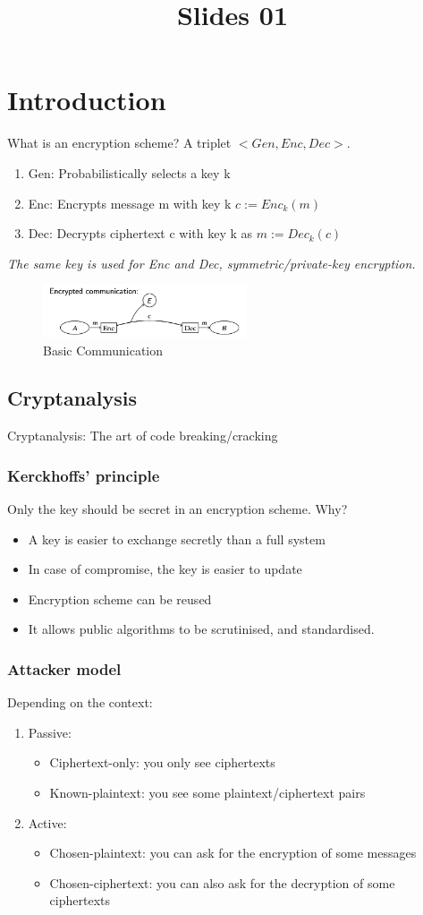 \documentclass[11pt, oneside]{article}   	%
\title{Slides 01}
\begin{document}
\maketitle
\section{Introduction}
What is an encryption scheme? A triplet  $<Gen,Enc,Dec>.$
\begin{enumerate}
\item Gen: Probabilistically selects a key k
\item Enc: Encrypts message m with key k $c := Enc_k(m)$
\item Dec: Decrypts ciphertext c with key k as $m := Dec_k(c)$
\end{enumerate}
\emph{The same key is used for Enc and Dec, symmetric/private-key encryption.}
\begin{figure}[ht]
    \centering
    \includegraphics[width=6cm]{figures/f1.png}
    \caption{Basic Communication}
\end{figure}
\subsection{Cryptanalysis}
Cryptanalysis: The art of code breaking/cracking
\subsubsection{Kerckhoffs' principle}
Only the key should be secret in an encryption scheme. Why?
\begin{itemize}
\item A key is easier to exchange secretly than a full system
\item In case of compromise, the key is easier to update
\item Encryption scheme can be reused
\item It allows public algorithms to be scrutinised, and standardised.
\end{itemize}
\subsubsection{Attacker model}
Depending on the context:
\begin{enumerate}
\item Passive:
	\begin{itemize}
	\item Ciphertext-only: you only see ciphertexts
	\item Known-plaintext: you see some plaintext/ciphertext pairs
	\end{itemize}
\item Active:
	\begin{itemize}
	\item Chosen-plaintext: you can ask for the encryption of some messages
	\item  Chosen-ciphertext: you can also ask for the decryption of some ciphertexts 
	\end{itemize}
\end{enumerate}
\end{document}
